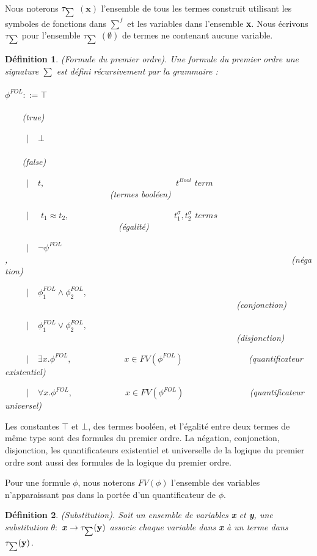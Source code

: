 \documentclass[9pt]{book}
\newcommand\smallsum{\mathsmaller\sum}
\newtheorem{definition}{D\'efinition}[section]
\begin{document}
Nous noterons $\tau_{\mathsmaller\sum}$ $(\textbf{x})$ l'ensemble de tous les termes construit utilisant les symboles de fonctions dans $\sum^{f}$ et les variables dans l'ensemble \textbf{x}. Nous \'ecrivons $\tau_{\mathsmaller\sum}$ pour l'ensemble $\tau_{\mathsmaller\sum}$ $(\emptyset)$ de termes ne contenant aucune variable.
\begin{definition} 
(Formule du premier ordre). Une formule du premier ordre une signature $\sum$ est d\'efini r\'ecursivement par la grammaire :\\
\\$\phi^{FOL} ::= \top$~~~~~~~~~~~~~~~~~~~~~~~~~~~~~~~~~~~~~~~~~~~~~~~~~~~~~~~~~~~~~~~~~~~~~~~~~~(true)\par
~~~~~$|$~~$\bot$~~~~~~~~~~~~~~~~~~~~~~~~~~~~~~~~~~~~~~~~~~~~~~~~~~~~~~~~~~~~~~~~~~~~~~~~~~(false)
\par
~~~~~$|$~~$t,$~~~~~~~~~~~~~~~~~~~~~~~~~~~~~~$t^{Bool}$ $term$~~~~~~~~~~~~~~~~~~~~~~~~(termes bool\'een)\par
~~~~~$|$~~ $t_{1} \approx t_{2},$~~~~~~~~~~~~~~~~~~~~~~~~$t_{1}^{\sigma},t_{2}^{\sigma}$ $terms$~~~~~~~~~~~~~~~~~~~~~~~~~~(\'egalit\'e)\par
~~~~~$|$~~$\neg\psi^{FOL}$,~~~~~~~~~~~~~~~~~~~~~~~~~~~~~~~~~~~~~~~~~~~~~~~~~~~~~~~~~~~~~~~~~(n\'egation)\par
~~~~~$|$~~$\phi_{1}^{FOL} \land \phi_{2}^{FOL},$~~~~~~~~~~~~~~~~~~~~~~~~~~~~~~~~~~~~~~~~~~~~~~~~~~~~~(conjonction)\par
~~~~~$|$~~$\phi_{1}^{FOL} \lor \phi_{2}^{FOL},$~~~~~~~~~~~~~~~~~~~~~~~~~~~~~~~~~~~~~~~~~~~~~~~~~~~~~(disjonction)\par
~~~~~$|$~~$\exists x.\phi^{FOL},$~~~~~~~~~~~~$x\in FV(\phi^{FOL})$~~~~~~~~~~~~~~~(quantificateur existentiel)\par
~~~~~$|$~~$\forall x.\phi^{FOL},$~~~~~~~~~~~~$x\in FV(\phi^{FOL})$~~~~~~~~~~~~~~~(quantificateur universel)
\end{definition}
Les constantes $\top$ et $\bot$, des termes bool\'een, et l'\'egalit\'e entre deux termes de m\^eme type sont des formules du premier ordre. La n\'egation, conjonction, disjonction, les quantificateurs existentiel et universelle de la logique du premier ordre sont aussi des formules de la logique du premier ordre.\par
	Pour une formule $\phi$, nous noterons $FV(\phi)$ l'ensemble des variables n'apparaissant pas dans la port\'ee d'un quantificateur de $\phi$.

\begin{definition}
(Substitution). Soit un ensemble de variables \textbf{x} et \textbf{y}, une substitution $\theta :$ \textbf{x} $\rightarrow \tau_{\smallsum}(\textbf{y})$ associe chaque variable dans \textbf{x} \`a un terme dans $\tau_{\mathsmaller\sum}(\textbf{y})$.
\end{definition}
\end{document}
